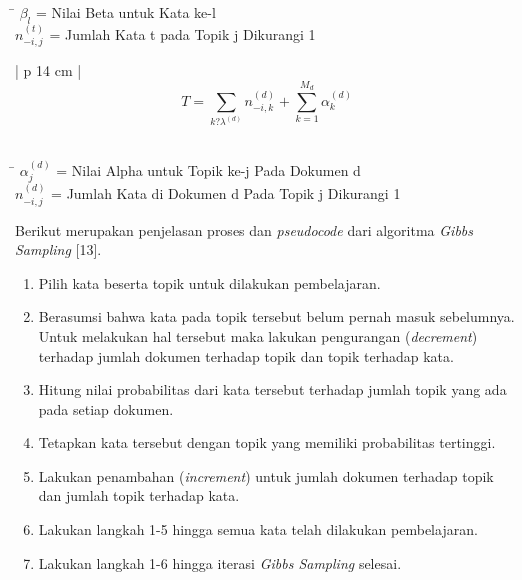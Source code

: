 {\begin{tabbing}[H]
\= \kill
\small{\hspace{35mm}$\beta_l$ = Nilai Beta untuk Kata ke-l}\\
\small{\hspace{35mm}$n_{-i,j}^{(t)}$ = Jumlah Kata t pada Topik j Dikurangi 1}
\end{tabbing}

\begin{table}[H]
\small
\centering
\begin{adjustbox}{width=1\textwidth}
\begin{tabular}{| p {14 cm} |}
\hline
{}
\begin{equation}
T=\sum_{k?\lambda ^{(d)}}{n_{-i, k}^{(d)}}+ \sum_{k=1}^{M_{d}}{\alpha_{k}^{(d)}}
\end{equation}\\
\hline
\end{tabular}
\end{adjustbox}
\end{table}

\begin{tabbing}[H]
\= \kill
\small{\hspace{30mm}$\alpha_j^{(d)}$ = Nilai Alpha untuk Topik ke-j Pada Dokumen d}\\
\small{\hspace{30mm}$n_{-i,j}^{(d)}$ = Jumlah Kata di Dokumen d Pada Topik j Dikurangi 1}
\end{tabbing}

\indent
Berikut merupakan penjelasan proses dan {\itshape pseudocode} dari algoritma {\itshape Gibbs Sampling} [13].

\begin{enumerate}[nolistsep,leftmargin=0.5cm]
\item
Pilih kata beserta topik untuk dilakukan pembelajaran.
\item
Berasumsi bahwa kata pada topik tersebut belum pernah masuk sebelumnya. Untuk melakukan hal tersebut maka lakukan pengurangan ({\itshape decrement}) terhadap jumlah dokumen terhadap topik dan topik terhadap kata.
\item
Hitung nilai probabilitas dari kata tersebut terhadap jumlah topik yang ada pada setiap dokumen.
\item
Tetapkan kata tersebut dengan topik yang memiliki probabilitas tertinggi.
\item
Lakukan penambahan ({\itshape increment}) untuk jumlah dokumen terhadap topik dan jumlah topik terhadap kata.
\item
Lakukan langkah 1-5 hingga semua kata telah dilakukan pembelajaran.
\item
Lakukan langkah 1-6 hingga iterasi {\itshape Gibbs Sampling} selesai.
\end{enumerate}

}
